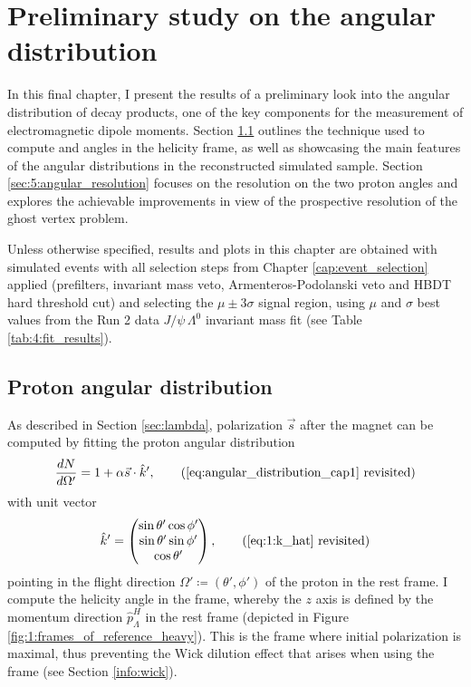 \chapter{Preliminary study on the \texorpdfstring{\lambdadecay}{Lambda baryon decay} angular distribution}
\label{cap:angular_distribution}

In this final chapter, I present the results of a preliminary look into the angular distribution of \lambdadecay decay products, one of the key components for the measurement of \lz electromagnetic dipole moments.
Section \ref{sec:5:angular_distribution} outlines the technique used to compute \thetap and \phip angles in the \lz helicity frame, as well as showcasing the main features of the angular distributions in the reconstructed \demonstratorshort simulated sample.
Section \ref{sec:5:angular_resolution} focuses on the resolution on the two proton angles and explores the achievable improvements in view of the prospective resolution of the ghost vertex problem.

Unless otherwise specified, results and plots in this chapter are obtained with simulated \demonstratorshort events with all selection steps from Chapter \ref{cap:event_selection} applied (prefilters, \bz invariant mass veto, \kshort Armenteros-Podolanski veto and HBDT hard threshold cut) and selecting the $\mu \pm 3\sigma$ signal region, using $\mu$ and $\sigma$ best values from the Run 2 data $J/\psi\,\Lambda^0$ invariant mass fit (see Table \ref{tab:4:fit_results}).

\section{Proton angular distribution}
\label{sec:5:angular_distribution}
As described in Section \ref{sec:lambda}, \lz polarization $\vec{s}$ after the magnet can be computed by fitting the proton angular distribution
\begin{equation*}
	\frac{dN}{d\Omega'} = 1+ \alpha \vec{s} \cdot \hat{k}',
	\tag{\ref{eq:angular_distribution_cap1} revisited}
\end{equation*}
with unit vector
\begin{equation*}
\hat{k}'
=
\begin{pmatrix}
	\sin \theta' \cos \phi' \\
	\sin \theta' \sin \phi' \\
	\cos \theta'
\end{pmatrix},
\tag{\ref{eq:1:k_hat} revisited}
\end{equation*}
pointing in the flight direction $\Omega' \coloneqq (\theta',\phi')$ of the proton in the \lz rest frame.
I compute the helicity angle in the \slambda frame, whereby the $z$ axis is defined by the \lz momentum direction $\hat{p}_\Lambda^H$ in the \lbz rest frame \shad (depicted in Figure \ref{fig:1:frames_of_reference_heavy}).
This is the frame where initial \lz polarization is maximal, thus preventing the Wick dilution effect that arises when using the \slambdal frame (see Section \ref{info:wick}).

